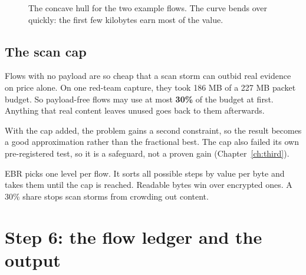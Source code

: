 \begin{figure}[H]
\centering
{}
\caption{The concave hull for the two example flows. The curve bends over quickly: the first few kilobytes earn most of the value.}
\end{figure}

\section{The scan cap}
\label{sec:scancap}
Flows with no payload are so cheap that a scan storm can outbid real evidence on price alone. On one red-team capture, they took 186 MB of a 227 MB packet budget. So payload-free flows may use at most \textbf{30\%} of the budget at first. Anything that real content leaves unused goes back to them afterwards.

\begin{honest}
With the cap added, the problem gains a second constraint, so the result becomes a good approximation rather than the fractional best. The cap also failed its own pre-registered test, so it is a safeguard, not a proven gain (Chapter~\ref{ch:third}).
\end{honest}

\begin{recap}
EBR picks one level per flow. It sorts all possible steps by value per byte and takes them until the cap is reached. Readable bytes win over encrypted ones. A 30\% share stops scan storms from crowding out content.
\end{recap}

\chapter{Step 6: the flow ledger and the output}

